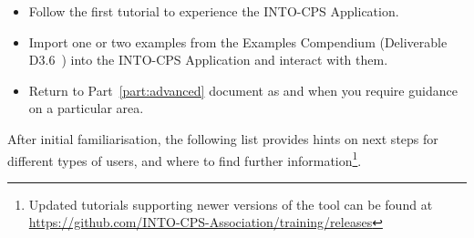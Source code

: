 \begin{itemize}[noitemsep]
  \item Follow the first tutorial to experience the INTO-CPS Application.
  \item Import one or two examples from the Examples Compendium (Deliverable D3.6~\cite{INTOCPSD3.6}) into the INTO-CPS Application and interact with them.
  \item Return to Part~\ref{part:advanced} document as and when you require guidance on a particular area.
\end{itemize}

After initial familiarisation, the following list provides hints on next steps for different types of users, and where to find further information\footnote{Updated tutorials supporting newer versions of the tool can be found at \url{https://github.com/INTO-CPS-Association/training/releases}}.

